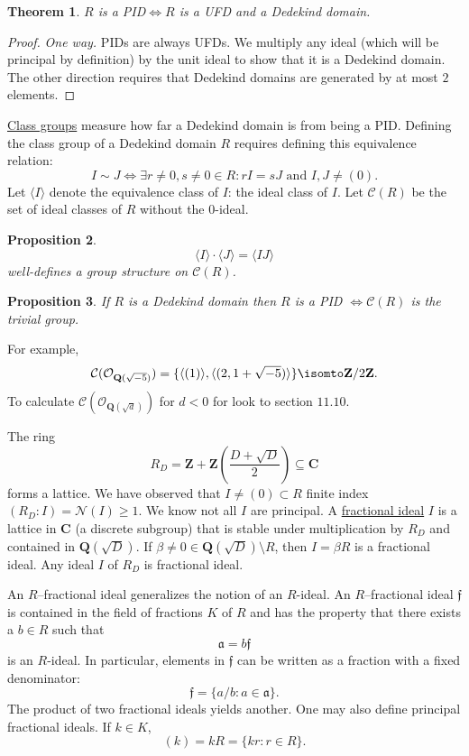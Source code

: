 \documentclass[11pt, oneside]{amsart}
\numberwithin{equation}{section}
\newtheorem{theorem}{Theorem}
\numberwithin{theorem}{section}
\newtheorem{proposition}[theorem]{Proposition}
\theoremstyle{definition}
\def\Z{\mathbf{Z}}
\def\Q{\mathbf{Q}}
\def\C{\mathbf{C}}
\def\N{\mathcal{N}}
\def\Or{\mathcal{O}}
\def\Cl{\mathcal{C}}
\begin{document}
{\begin{theorem}
$R$ is a PID$\iff R$ is a UFD and a Dedekind domain.
\end{theorem}
\begin{proof}
\textit{One way.} PIDs are always UFDs. We multiply any ideal (which will be principal by definition) by the unit ideal to show that it is a Dedekind domain. The other direction requires that Dedekind domains are generated by at most $2$ elements.
\end{proof}

\underline{Class groups} measure how far a Dedekind domain is from being a PID. Defining the class group of a Dedekind domain $R$ requires defining this equivalence relation:
$$
I\sim J \iff \exists r\neq 0,s\neq 0\in R : rI = sJ\textrm{ and } I,J\neq(0).
$$
Let $\langle I \rangle$ denote the equivalence class of $I$: the ideal class of $I$. Let $\Cl(R)$ be the set of ideal classes of $R$ without the $0$-ideal.
\begin{proposition}
 $$
\langle I\rangle \cdot \langle J\rangle = \langle IJ\rangle
$$ 
well-defines a group structure on $\Cl(R)$.
\end{proposition}
\begin{proposition}
If $R$ is a Dedekind domain then $R$ is a PID $\iff\Cl(R)$ is the trivial group.
\end{proposition}
For example,  
$$
\Cl(\Or_{\Q(\sqrt{-5})}) = \{\langle (1)\rangle, \langle (2, 1+\sqrt{-5} )\rangle \}\isomto \Z/2\Z.
$$
To calculate $\Cl (\Or_{\Q(\sqrt d)})$ for $d<0$ for look to section $11.10$. %

The ring
$$
R_D = \Z + \Z\left(\frac{D + \sqrt D}{2}\right) \subseteq \C
$$
forms a lattice. We have observed that $I \neq (0) \subset R$ finite index $(R_D : I) = \N(I)\geqslant 1$. We know not all $I$ are principal. A \underline{fractional ideal} $I$ is a lattice in $\C$ (a discrete subgroup) that is stable under multiplication by $R_D$ and contained in $\Q(\sqrt D)$. If $\beta\neq 0\in\Q(\sqrt D)\setminus R$, then $I=\beta R$ is a fractional ideal. Any ideal $I$ of $R_D$ is fractional ideal.

An $R$--fractional ideal generalizes the notion of an $R$-ideal. An $R$--fractional ideal $\mathfrak{f}$ is contained in the field of fractions $K$ of $R$ and has the property that there exists a $b\in R$ such that
$$
\mathfrak{a} = b\mathfrak{f}
$$
is an $R$-ideal. In particular, elements in $\mathfrak{f}$ can be written as a fraction with a fixed denominator:
$$
\mathfrak{f} = \{ a/b : a\in\mathfrak{a} \}.
$$
The product of two fractional ideals yields another. One may also define principal fractional ideals. If $k\in K$, 
$$
(k) = kR = \{ kr : r\in R \}.
$$

}
\end{document}
